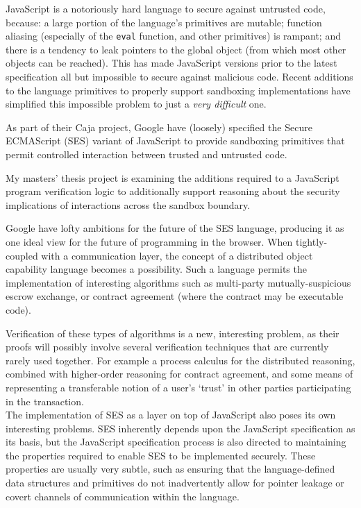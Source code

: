 \documentclass[a4paper]{article}
\begin{document}
JavaScript is a notoriously hard language to secure against untrusted code,
because: a large portion of the language's primitives are mutable; function aliasing
(especially of the \texttt{eval} function, and other primitives) is rampant; and
there is a tendency
to leak pointers to the global object (from which most other objects can be
reached). This has made JavaScript versions prior to the latest specification
all but impossible to secure against malicious code. Recent additions to the
language primitives to properly support sandboxing implementations have
simplified this impossible problem to just a \emph{very difficult} one.

As part of their Caja project, Google have (loosely) specified the Secure
ECMAScript (SES) variant of JavaScript to provide sandboxing primitives that
permit controlled interaction between trusted and untrusted code.

My masters' thesis project is examining the additions required to a JavaScript
program verification logic to additionally support reasoning about the security
implications of interactions across the sandbox boundary.

Google have lofty ambitions for the future of the SES language, producing it as
one ideal view for the future of programming in the browser. When
tightly-coupled with a communication layer, the concept of a distributed object
capability language becomes a possibility. Such a language permits the
implementation of interesting algorithms such as multi-party mutually-suspicious
escrow exchange, or contract agreement (where the contract may be executable
code).

Verification of these types of algorithms is a new, interesting problem, as
their proofs will possibly involve several verification techniques that are
currently rarely used together. For example a process calculus for the
distributed reasoning, combined with higher-order reasoning for contract
agreement, and some means of representing a transferable notion of a user's
`trust' in other parties participating in the transaction.
\\

The implementation of SES as a layer on top of JavaScript also poses its own
interesting problems. SES inherently depends upon the JavaScript specification
as its basis, but the JavaScript specification process is also directed to
maintaining the properties required to enable SES to be implemented securely.
These properties are usually very subtle, such as ensuring that the
language-defined data structures and primitives do not inadvertently allow for
pointer leakage or covert channels of communication within the language.
\end{document}
